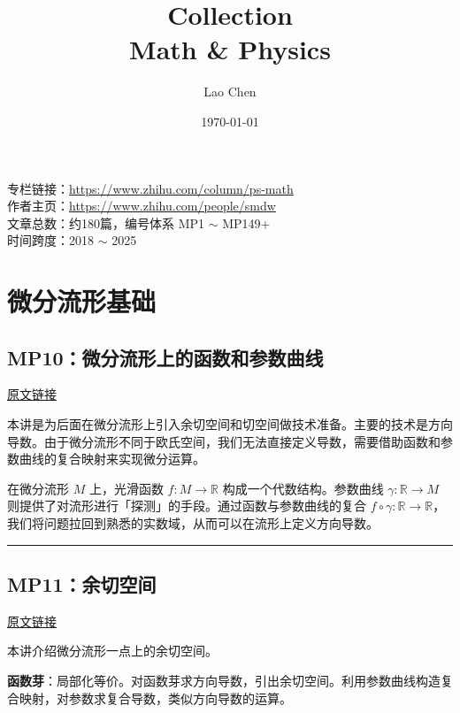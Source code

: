 \documentclass[10pt, openany]{book}
\begin{document}
\frontmatter
\title{\textbf{Collection}\\ \large Math \& Physics}
\author{Lao Chen}
\date{\today}
\maketitle


\begin{center}
\large
专栏链接：\url{https://www.zhihu.com/column/ps-math}\\[6pt]
作者主页：\url{https://www.zhihu.com/people/smdw}\\[6pt]
文章总数：约180篇，编号体系 MP1 $\sim$ MP149+\\[6pt]
时间跨度：2018 $\sim$ 2025
\end{center}

\tableofcontents

\mainmatter

\chapter{微分流形基础}

\section{MP10：微分流形上的函数和参数曲线}
\label{sec:mp10}

\href{https://zhuanlan.zhihu.com/p/44203444}{原文链接}

本讲是为后面在微分流形上引入余切空间和切空间做技术准备。主要的技术是方向导数。由于微分流形不同于欧氏空间，我们无法直接定义导数，需要借助函数和参数曲线的复合映射来实现微分运算。

在微分流形 $M$ 上，光滑函数 $f: M \to \mathbb{R}$ 构成一个代数结构。参数曲线 $\gamma: \mathbb{R} \to M$ 则提供了对流形进行「探测」的手段。通过函数与参数曲线的复合 $f \circ \gamma: \mathbb{R} \to \mathbb{R}$，我们将问题拉回到熟悉的实数域，从而可以在流形上定义方向导数。

\medskip
\noindent\rule{\textwidth}{0.4pt}

\section{MP11：余切空间}
\label{sec:mp11}

\href{https://zhuanlan.zhihu.com/p/44190499}{原文链接}

本讲介绍微分流形一点上的余切空间。

\textbf{函数芽}：局部化等价。对函数芽求方向导数，引出余切空间。利用参数曲线构造复合映射，对参数求复合导数，类似方向导数的运算。
\end{document}
